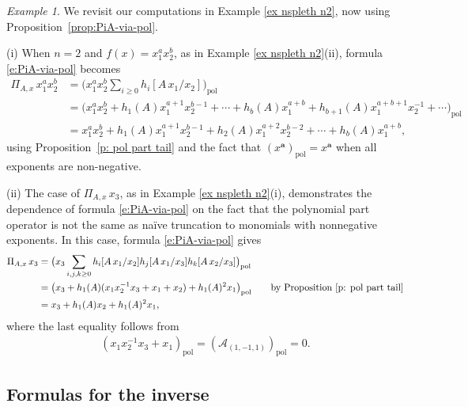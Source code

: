 \documentclass[12pt]{amsart}
\theoremstyle{definition}
\theoremstyle{remark}
\newtheorem{example}[thm]{Example}
\newcommand{\aA}{{\mathbf a}}
\newcommand{\Acal}{{\mathcal A}}
\DeclareMathOperator{\pol}{pol}
\begin{document}
\begin{example}\label{ex:ns-pleth-v2}
We revisit our computations in Example \ref{ex nspleth n2}, now using
Proposition~\ref{prop:PiA-via-pol}.

(i) When $n=2$ and $f(x) = x_1^ax_2^b$, as in Example \ref{ex nspleth
n2}(ii), formula \eqref{e:PiA-via-pol} becomes
\begin{equation}
\begin{aligned}
\Pi_{A,x} \, x_1^a x_2^b &= \big(x_1^a x_2^b \sum_{i \ge 0} h_i[A \, x_1/x_2] \big)_{\pol} \\
&= \big( x_1^a x_2^b + h_{1}(A) x_1^{a+1}x_2^{b-1} + \cdots + h_{b}(A) x_1^{a+b} +
h_{b+1}(A) x_1^{a+b+1} x_2^{-1} + \cdots \big)_{\pol} \\
 &= x_1^a x_2^b + h_{1}(A) x_1^{a+1}x_2^{b-1} + h_{2}(A)
x_1^{a+2}x_2^{b-2} + \cdots + h_{b}(A) x_1^{a+b},
\end{aligned}
\end{equation}
using Proposition~\ref{p: pol part tail} and
the fact that $(x^\aA)_{\pol } = x^\aA$ when all exponents are non-negative.

(ii) The case of $\Pi_{A,x} \, x_3$, as in Example \ref{ex nspleth
n2}(i), demonstrates the dependence of formula \eqref{e:PiA-via-pol}
on the fact that the polynomial part operator is not the same as
na\"ive truncation to monomials with nonnegative exponents.  In this
case, formula \eqref{e:PiA-via-pol} gives
\begin{equation}
\begin{aligned}
\Pi_{A,x} \, x_3 &= \big(x_3 \sum_{i,j,k \ge 0} h_i[A \, x_1/x_2]
h_j[A\, x_1/x_3]
h_k[A \, x_2/x_3] \big)_{\pol}  \\
&= \big(x_3+  h_1(A)(x_1x_2^{-1}x_3 + x_1 + x_2) + h_1(A)^2 x_1   \big)_{\pol}
\qquad  \text{by Proposition \ref{p: pol part tail}} \\
&= x_3+  h_1(A)x_2  + h_1(A)^2 x_1,
\end{aligned}
\end{equation}
where the last equality follows from
\begin{align}
(x_1x_2^{-1}x_3 + x_1 )_{\pol } = (\Acal_{(1,-1,1)})_{\pol } = 0.
\end{align}
\end{example}




\subsection{Formulas for the inverse}
\label{ss:PiA-inverse}
\end{document}
